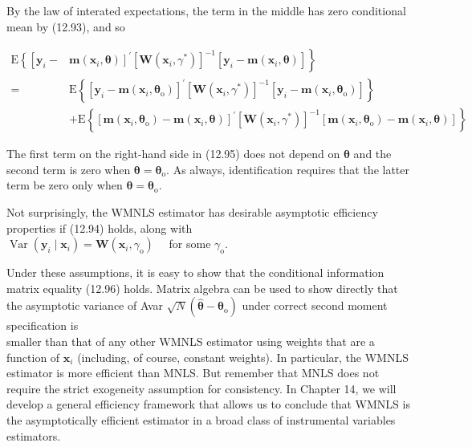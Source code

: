 \documentclass[10pt]{article}
\begin{document}
By the law of interated expectations, the term in the middle has zero conditional mean by (12.93), and so


\begin{align*}
\mathrm{E}\left\{\left[\mathbf{y}_{i}-\right.\right. & \left.\left.\mathbf{m}\left(\mathbf{x}_{i}, \boldsymbol{\theta}\right)\right]^{\prime}\left[\mathbf{W}\left(\mathbf{x}_{i}, \gamma^{*}\right)\right]^{-1}\left[\mathbf{y}_{i}-\mathbf{m}\left(\mathbf{x}_{i}, \boldsymbol{\theta}\right)\right]\right\} \\
= & \mathrm{E}\left\{\left[\mathbf{y}_{i}-\mathbf{m}\left(\mathbf{x}_{i}, \boldsymbol{\theta}_{\mathrm{o}}\right)\right]^{\prime}\left[\mathbf{W}\left(\mathbf{x}_{i}, \gamma^{*}\right)\right]^{-1}\left[\mathbf{y}_{i}-\mathbf{m}\left(\mathbf{x}_{i}, \boldsymbol{\theta}_{\mathrm{o}}\right)\right]\right\} \\
& +\mathrm{E}\left\{\left[\mathbf{m}\left(\mathbf{x}_{i}, \boldsymbol{\theta}_{\mathrm{o}}\right)-\mathbf{m}\left(\mathbf{x}_{i}, \boldsymbol{\theta}\right)\right]^{\prime}\left[\mathbf{W}\left(\mathbf{x}_{i}, \gamma^{*}\right)\right]^{-1}\left[\mathbf{m}\left(\mathbf{x}_{i}, \boldsymbol{\theta}_{\mathrm{o}}\right)-\mathbf{m}\left(\mathbf{x}_{i}, \boldsymbol{\theta}\right)\right]\right\} \tag{12.95}
\end{align*}


The first term on the right-hand side in (12.95) does not depend on $\boldsymbol{\theta}$ and the second term is zero when $\boldsymbol{\theta}=\boldsymbol{\theta}_{\mathrm{o}}$. As always, identification requires that the latter term be zero only when $\boldsymbol{\theta}=\boldsymbol{\theta}_{\mathrm{o}}$.

Not surprisingly, the WMNLS estimator has desirable asymptotic efficiency properties if (12.94) holds, along with\\
$\operatorname{Var}\left(\mathbf{y}_{i} \mid \mathbf{x}_{i}\right)=\mathbf{W}\left(\mathbf{x}_{i}, \gamma_{\mathrm{o}}\right) \quad$ for some $\gamma_{\mathrm{o}}$.

Under these assumptions, it is easy to show that the conditional information matrix equality (12.96) holds. Matrix algebra can be used to show directly that the asymptotic variance of Avar $\sqrt{N}\left(\hat{\boldsymbol{\theta}}-\boldsymbol{\theta}_{\mathrm{o}}\right)$ under correct second moment specification is\\
smaller than that of any other WMNLS estimator using weights that are a function of $\mathbf{x}_{i}$ (including, of course, constant weights). In particular, the WMNLS estimator is more efficient than MNLS. But remember that MNLS does not require the strict exogeneity assumption for consistency. In Chapter 14, we will develop a general efficiency framework that allows us to conclude that WMNLS is the asymptotically efficient estimator in a broad class of instrumental variables estimators.
\end{document}
